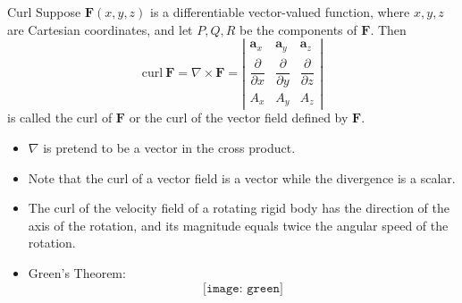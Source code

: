 \documentclass[10pt]{beamer}
\begin{document}
\begin{frame}[allowframebreaks]{Curl}
Suppose $\mathbf{F}(x, y, z)$ is a differentiable vector-valued function, where $x, y, z$ are
Cartesian coordinates, and let $P, Q, R$ be the components of $\mathbf{F}$. Then
\[\text{curl}~\mathbf{F} = \nabla\times\mathbf{F} = \left\vert
\begin{matrix}
\mathbf{a}_x & \mathbf{a}_y & \mathbf{a}_z\\
\dfrac{\partial }{\partial x} & \dfrac{\partial }{\partial y} & \dfrac{\partial }{\partial z}\\
A_x & A_y & A_z
\end{matrix}
\right\vert\]
is called the {\color{blue}curl} of $\mathbf{F}$ or the {\color{blue}curl of the vector field} defined by $\mathbf{F}$.
\begin{itemize}
	\item $\nabla$ is pretend to be a vector in the cross product.
	\item Note that the curl of a vector field is a vector while the divergence is a scalar.
	\item The curl of the velocity field of a rotating rigid body has the direction of the axis of the rotation, and its magnitude equals {\color{red}twice} the angular speed of the rotation.
	\item Green's Theorem: $$\texttt{[image: green]}$$
\end{itemize}
\end{frame}
\end{document}
